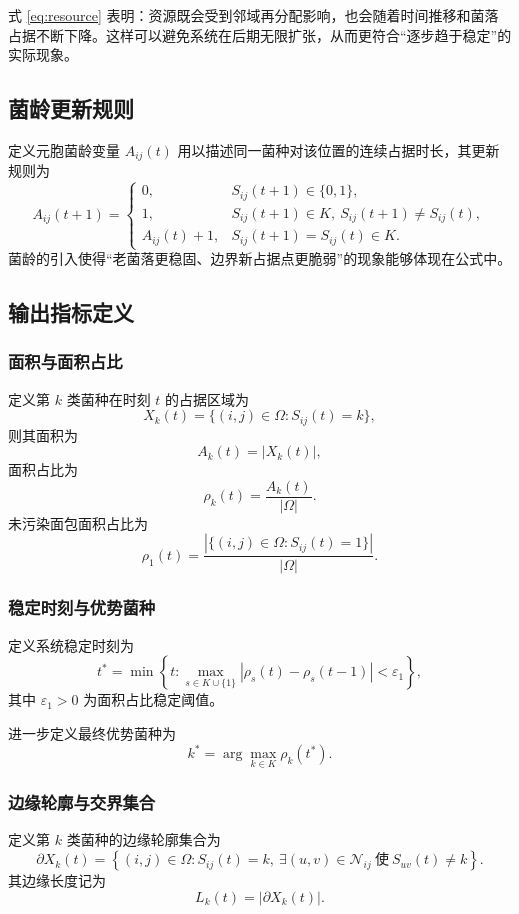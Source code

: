 \documentclass[12pt,a4paper]{ctexart}
\begin{document}
式 \eqref{eq:resource} 表明：资源既会受到邻域再分配影响，也会随着时间推移和菌落占据不断下降。这样可以避免系统在后期无限扩张，从而更符合“逐步趋于稳定”的实际现象。

\subsection{菌龄更新规则}

定义元胞菌龄变量 \(A_{ij}(t)\) 用以描述同一菌种对该位置的连续占据时长，其更新规则为
\[
A_{ij}(t+1)=
\begin{cases}
0, & S_{ij}(t+1)\in\{0,1\},\\
1, & S_{ij}(t+1)\in K,\ S_{ij}(t+1)\neq S_{ij}(t),\\
A_{ij}(t)+1, & S_{ij}(t+1)=S_{ij}(t)\in K.
\end{cases}
\]
菌龄的引入使得“老菌落更稳固、边界新占据点更脆弱”的现象能够体现在公式中。

\subsection{输出指标定义}

\subsubsection{面积与面积占比}

定义第 \(k\) 类菌种在时刻 \(t\) 的占据区域为
\[
X_k(t)=\{(i,j)\in\Omega:S_{ij}(t)=k\},
\]
则其面积为
\[
A_k(t)=|X_k(t)|,
\]
面积占比为
\[
\rho_k(t)=\frac{A_k(t)}{|\Omega|}.
\]
未污染面包面积占比为
\[
\rho_1(t)=\frac{|\{(i,j)\in\Omega:S_{ij}(t)=1\}|}{|\Omega|}.
\]

\subsubsection{稳定时刻与优势菌种}

定义系统稳定时刻为
\[
t^\ast=
\min\left\{
t:
\max_{s\in K\cup\{1\}}
\left|\rho_s(t)-\rho_s(t-1)\right|<\varepsilon_1
\right\},
\]
其中 \(\varepsilon_1>0\) 为面积占比稳定阈值。

进一步定义最终优势菌种为
\[
k^\ast=\arg\max_{k\in K}\rho_k(t^\ast).
\]

\subsubsection{边缘轮廓与交界集合}

定义第 \(k\) 类菌种的边缘轮廓集合为
\[
\partial X_k(t)=
\left\{
(i,j)\in\Omega:
S_{ij}(t)=k,\ 
\exists (u,v)\in\mathcal N_{ij}\ \text{使}\ S_{uv}(t)\neq k
\right\}.
\]
其边缘长度记为
\[
L_k(t)=|\partial X_k(t)|.
\]
\end{document}
